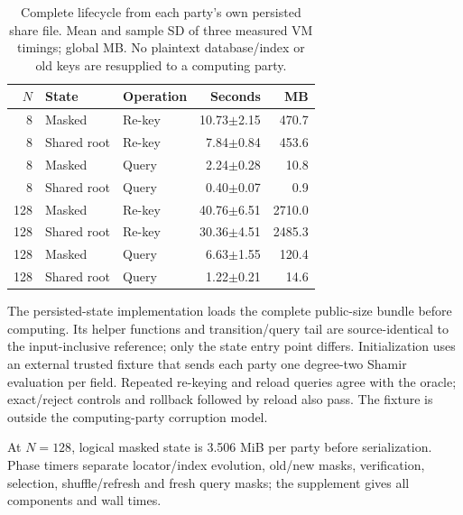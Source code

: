 \begin{table}[t]
\caption{Complete lifecycle from each party's own persisted share file. Mean and sample SD of three measured VM timings; global MB. No plaintext database/index or old keys are resupplied to a computing party.}
\label{tab:persisted}\centering\small
\setlength{\tabcolsep}{3pt}
\begin{tabular}{rllrr}
\toprule
$N$ & State & Operation & Seconds & MB \\
\midrule
8 & Masked & Re-key & 10.73$\pm$2.15 & 470.7 \\
8 & Shared root & Re-key & 7.84$\pm$0.84 & 453.6 \\
8 & Masked & Query & 2.24$\pm$0.28 & 10.8 \\
8 & Shared root & Query & 0.40$\pm$0.07 & 0.9 \\
128 & Masked & Re-key & 40.76$\pm$6.51 & 2710.0 \\
128 & Shared root & Re-key & 30.36$\pm$4.51 & 2485.3 \\
128 & Masked & Query & 6.63$\pm$1.55 & 120.4 \\
128 & Shared root & Query & 1.22$\pm$0.21 & 14.6 \\
\bottomrule
\end{tabular}
\end{table}

The persisted-state implementation loads the complete public-size bundle before computing. Its helper functions and transition/query tail are source-identical to the input-inclusive reference; only the state entry point differs. Initialization uses an external trusted fixture that sends each party one degree-two Shamir evaluation per field. Repeated re-keying and reload queries agree with the oracle; exact/reject controls and rollback followed by reload also pass. The fixture is outside the computing-party corruption model.

At $N=128$, logical masked state is 3.506 MiB per party before serialization. Phase timers separate locator/index evolution, old/new masks, verification, selection, shuffle/refresh and fresh query masks; the supplement gives all components and wall times.

